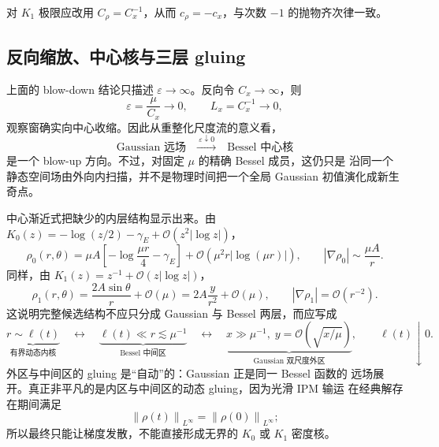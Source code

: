 \documentclass[11pt,a4paper,fontset=fandol]{ctexart}
\newcommand{\grad}{\nabla}
\newcommand{\abs}[1]{\left\lvert #1\right\rvert}
\newcommand{\norm}[1]{\left\lVert #1\right\rVert}
\newcommand{\Order}{\mathcal O}
\begin{document}
对 $K_1$ 极限应改用 $C_\rho=C_x^{-1}$，从而
$c_\rho=-c_x$，与次数 $-1$ 的抛物齐次律一致。

\subsection{反向缩放、中心核与三层 gluing}

上面的 blow-down 结论只描述 $\varepsilon\to\infty$。反向令
$C_x\to\infty$，则
\begin{equation}
  \varepsilon=\frac{\mu}{C_x}\to0,
  \qquad L_x=C_x^{-1}\to0,
\end{equation}
观察窗确实向中心收缩。因此从重整化尺度流的意义看，
\begin{equation}
  \text{Gaussian 远场}
  \quad\xrightarrow{\ \varepsilon\downarrow0\ }\quad
  \text{Bessel 中心核}
  \label{eq:gaussian-to-bessel-rg}
\end{equation}
是一个 blow-up 方向。不过，对固定 $\mu$ 的精确 Bessel 成员，这仍只是
沿同一个静态空间场由外向内扫描，并不是物理时间把一个全局 Gaussian
初值演化成新生奇点。

中心渐近式把缺少的内层结构显示出来。由
$K_0(z)=-\log(z/2)-\gamma_E+\Order(z^2\abs{\log z})$，
\begin{equation}
  \rho_0(r,\theta)
  =\mu A\left[-\log\frac{\mu r}{4}-\gamma_E\right]
  +\Order\!\left(\mu^2r\abs{\log(\mu r)}\right),
  \qquad
  \abs{\grad\rho_0}\sim\frac{\mu A}{r}.
  \label{eq:k0-core}
\end{equation}
同样，由 $K_1(z)=z^{-1}+\Order(z\abs{\log z})$，
\begin{equation}
  \rho_1(r,\theta)
  =\frac{2A\sin\theta}{r}+\Order\!\left(\mu\right)
  =2A\frac{y}{r^2}+\Order\!\left(\mu\right),
  \qquad
  \abs{\grad\rho_1}=\Order(r^{-2}).
  \label{eq:k1-core}
\end{equation}
这说明完整候选结构不应只分成 Gaussian 与 Bessel 两层，而应写成
\begin{equation}
  \underbrace{r\sim\ell(t)}_{\text{有界动态内核}}
  \quad\longleftrightarrow\quad
  \underbrace{\ell(t)\ll r\lesssim\mu^{-1}}_{\text{Bessel 中间区}}
  \quad\longleftrightarrow\quad
  \underbrace{x\gg\mu^{-1},\;
    y=\Order(\sqrt{x/\mu})}_{\text{Gaussian 双尺度外区}},
  \qquad \ell(t)\downarrow0.
  \label{eq:three-layer-gluing}
\end{equation}
外区与中间区的 gluing 是“自动”的：Gaussian 正是同一 Bessel 函数的
远场展开。真正非平凡的是内区与中间区的动态 gluing，因为光滑 IPM 输运
在经典解存在期间满足
\begin{equation}
  \norm{\rho(t)}_{L^\infty}=\norm{\rho(0)}_{L^\infty};
  \label{eq:linfty-transport}
\end{equation}
所以最终只能让梯度发散，不能直接形成无界的 $K_0$ 或 $K_1$ 密度核。
\end{document}
